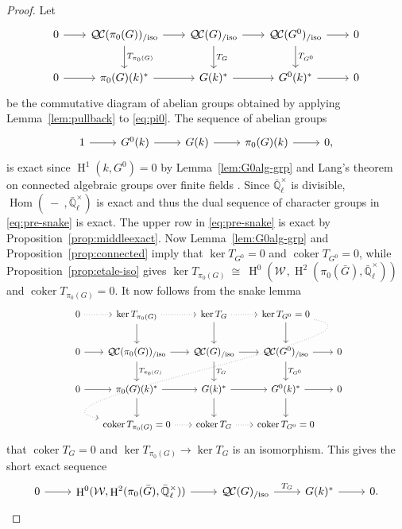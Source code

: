 \documentclass[10pt]{amsart}
\theoremstyle{plain}
\theoremstyle{definition}
\theoremstyle{remark}
\newcommand{\EE}{\mathbb{\bar Q}_\ell}
\newcommand{\Fq}{k}
\newcommand{\EEx}{\EE^\times}
\newcommand{\Weil}[1]{\mathcal{W}_{#1}}
\DeclareMathOperator{\Hom}{Hom}
\DeclareMathOperator{\coker}{coker}
\DeclareMathOperator{\Hh}{H}
\newcommand{\iso}{{\ \cong\ }}
\newcommand{\TrFrob}[1]{T_{#1}}
\newcommand{\QC}{{\mathcal{Q\hskip-0.8pt C}}}
\newcommand{\QCiso}[1]{\QC(#1)_{/\text{iso}}}
\newcommand{\bG}{\bar{G}}
\begin{document}
\begin{proof}
  Let
  \begin{equation}\label{eq:pre-snake}
  \begin{tikzcd}[row sep=20, column sep=20]
    0 \rar & \QCiso{\pi_0(G)} \rar \dar{\TrFrob{\pi_0(G)}}
    & \QCiso{G} \rar \dar{\TrFrob{G}} & \QCiso{G^0} \rar \dar{\TrFrob{G^0}} & 0\\
    0 \rar & \pi_0(G)(\Fq)^* \rar
    &  G(\Fq)^* \rar & G^0(\Fq)^* \rar & 0
  \end{tikzcd}
  \end{equation}
  be the commutative diagram of abelian groups obtained by applying
  Lemma~\ref{lem:pullback} to \eqref{eq:pi0}.
  The sequence of abelian groups
\[
  \begin{tikzcd}
    1 \rar & G^0(\Fq) \rar & G(\Fq) \rar & \pi_0(G)(\Fq) \rar & 0,
  \end{tikzcd}
\]
  is exact since $\Hh^1(\Fq,G^0) =0$ by Lemma~\ref{lem:G0alg-grp} and Lang's theorem on connected algebraic groups over finite fields \cite{lang:56a}.
  Since $\EEx$ is divisible, $\Hom(\ - \ ,\EEx)$ is exact and thus the dual sequence of
  character groups in \eqref{eq:pre-snake} is exact.
%
  The upper row in \eqref{eq:pre-snake} is exact by Proposition~\ref{prop:middleexact}.
  Now Lemma~\ref{lem:G0alg-grp} and Proposition~\ref{prop:connected}
  imply that $\ker \TrFrob{G^0} =0$ and $\coker \TrFrob{G^0}=0$,
  while Proposition~\ref{prop:etale-iso} gives $\ker \TrFrob{\pi_0(G)} \iso \Hh^0(\Weil{},\Hh^2(\pi_0({\bar G}),\EEx))$
  and $\coker \TrFrob{\pi_0(G)}=0$.
It now follows from the snake lemma
 \[
  \begin{tikzcd}[row sep=20, column sep=15]
    0 \arrow[dotted]{r} & \ker \TrFrob{\pi_0(G)} \arrow[dotted]{r} \dar & \arrow{d} \ker \TrFrob{G} \arrow[dotted]{r} & \ker \TrFrob{G^0} =0 \arrow[dotted, out=-10, in=170]{dddll} \dar & \\
    0 \rar & \QCiso{\pi_0(G)} \rar \dar{\TrFrob{\pi_0(G)}}
    & \QCiso{G} \rar \dar{\TrFrob{G}} & \QCiso{G^0} \rar \dar{\TrFrob{G^0}} & 0\\
    0 \rar & \pi_0(G)(\Fq)^* \rar \dar
    & \arrow{d} G(\Fq)^* \rar & G^0(\Fq)^* \rar \dar & 0\\
   &  \coker \TrFrob{\pi_0(G)} =0 \arrow[dotted]{r} & \coker \TrFrob{G} \arrow[dotted]{r} & \coker \TrFrob{G^0} =0 & 
  \end{tikzcd}
  \]
that $\coker \TrFrob{G} =0$
and $\ker \TrFrob{\pi_0(G)} \to \ker \TrFrob{G}$ is an isomorphism.
This gives the short exact sequence
\[
  \begin{tikzcd}
0 \arrow{r} & \Hh^0(\Weil{},\Hh^2(\pi_0(\bG),\EEx)) \arrow{r} & \QCiso{G} \arrow{r}{\TrFrob{G}} & G(\Fq)^* \arrow{r} & 0. 
  \end{tikzcd}
\]
\end{proof}
\end{document}
